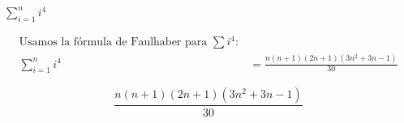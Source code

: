 $\displaystyle \sum_{i=1}^{n} i^4$

\nopagebreak
\begin{align*}
\text{Usamos la fórmula de Faulhaber para } \sum i^4: \\
\sum_{i=1}^{n} i^4 &= \frac{n(n+1)(2n+1)(3n^2+3n-1)}{30}
\end{align*}

\[
\boxed{\displaystyle \frac{n(n+1)(2n+1)(3n^2+3n-1)}{30}}
\]
